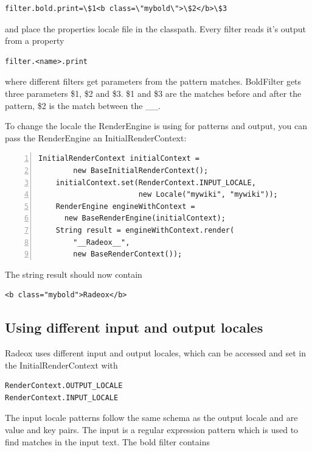 \documentclass[a4paper,pdftex]{article}
\begin{document}
\begin{verbatim}
filter.bold.print=\$1<b class=\"mybold\">\$2</b>\$3
\end{verbatim}

and place the properties locale file in the classpath. Every filter
reads it's output from a property

\begin{verbatim}
filter.<name>.print 
\end{verbatim}

where 
different filters get parameters from the pattern matches.
BoldFilter gets three parameters \$1, \$2 and \$3. 
\$1 and \$3 are the matches before and after the pattern, 
\$2 is the match between the \_\_.

To change the locale the RenderEngine is using for
patterns and output, you can pass the RenderEngine an InitialRenderContext:

\begin{Verbatim}[gobble=4,frame=single,numbers=left,fontsize=\small]
    InitialRenderContext initialContext =
        new BaseInitialRenderContext();
    initialContext.set(RenderContext.INPUT_LOCALE,
                       new Locale("mywiki", "mywiki"));
    RenderEngine engineWithContext =
      new BaseRenderEngine(initialContext);
    String result = engineWithContext.render(
        "__Radeox__",
        new BaseRenderContext());
\end{Verbatim}

The string result should now contain

\begin{verbatim}
<b class="mybold">Radeox</b>
\end{verbatim}

\subsection{Using different input and output locales}

Radeox uses different input and output locales, which can be accessed and set
in the InitialRenderContext with

\begin{verbatim}
RenderContext.OUTPUT_LOCALE
RenderContext.INPUT_LOCALE
\end{verbatim}

The input locale patterns  follow the same schema as the output locale and
are value and key pairs. The input is a regular expression pattern which is used to
find matches in the input text. The bold filter contains 
\end{document}
